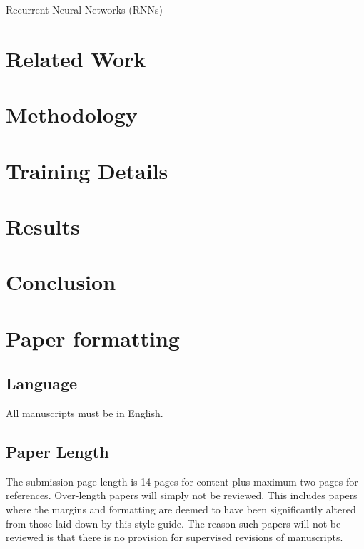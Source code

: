 \documentclass[runningheads]{llncs}
\begin{document}
Recurrent Neural Networks (RNNs) 


\section{Related Work}

\section{Methodology}

\section{Training Details}

\section{Results}

\section{Conclusion}

\section{Paper formatting}

\subsection{Language}

All manuscripts must be in English.

\subsection{Paper Length}
The submission page length is 14 pages for content plus maximum two pages for references.
Over-length papers will
simply not be reviewed. This includes papers where the margins and
formatting are deemed to have been significantly altered from those
laid down by this style guide. The reason such papers will not be
reviewed is that there is no provision for supervised revisions of
manuscripts. 
\end{document}
